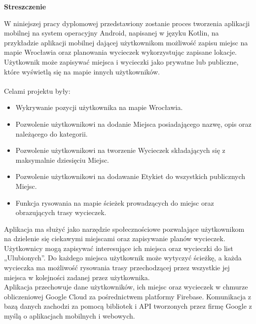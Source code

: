 \newpage

    \begin{flushleft}
    \Large \textbf{Streszczenie}
    \end{flushleft}

    \vspace{1cm}
        W niniejszej pracy dyplomowej przedstawiony zostanie proces tworzenia aplikacji mobilnej na system operacyjny Android, napisanej w języku Kotlin, na przykładzie
        aplikacji mobilnej dającej użytkownikom możliwość zapisu miejsc na mapie Wrocławia oraz planowania wycieczek wykorzystując zapisane lokacje.
        Użytkownik może zapisywać miejsca i wycieczki jako prywatne lub publiczne, które wyświetlą się na mapie innych użytkowników. \\ \\
        Celami projektu były:
        \begin{itemize}
            \item Wykrywanie pozycji użytkownika na mapie Wrocławia.
            \item Pozwolenie użytkownikowi na dodanie Miejsca posiadającego nazwę, opis oraz należącego do kategorii.
            \item Pozwolenie użytkownikowi na tworzenie Wycieczek składających się z maksymalnie dziesięciu Miejsc.
            \item Pozwolenie użytkownikowi na dodawanie Etykiet do wszystkich publicznych Miejsc. 
            \item Funkcja rysowania na mapie ścieżek prowadzących do miejsc oraz obrazujących trasy wycieczek. \\
        \end{itemize}

        Aplikacja ma służyć jako narzędzie społecznościowe pozwalające użytkownikom na dzielenie się ciekawymi miejscami oraz zapisywanie planów wycieczek.
        Użytkownicy mogą zapisywać interesujące ich miejsca oraz wycieczki do list „Ulubionych”. Do każdego miejsca użytkownik może wytyczyć ścieżkę, a każda
        wycieczka ma możliwość rysowania trasy przechodzącej przez wszystkie jej miejsca w kolejności zadanej przez użytkownika. \\

        Aplikacja przechowuje dane użytkowników, ich miejsc oraz wycieczek w chmurze obliczeniowej Google Cloud za pośrednictwem platformy Firebase.
        Komunikacja z bazą danych zachodzi za pomocą bibliotek i API tworzonych przez firmę Google z myślą o aplikacjach mobilnych i webowych. \\ 

